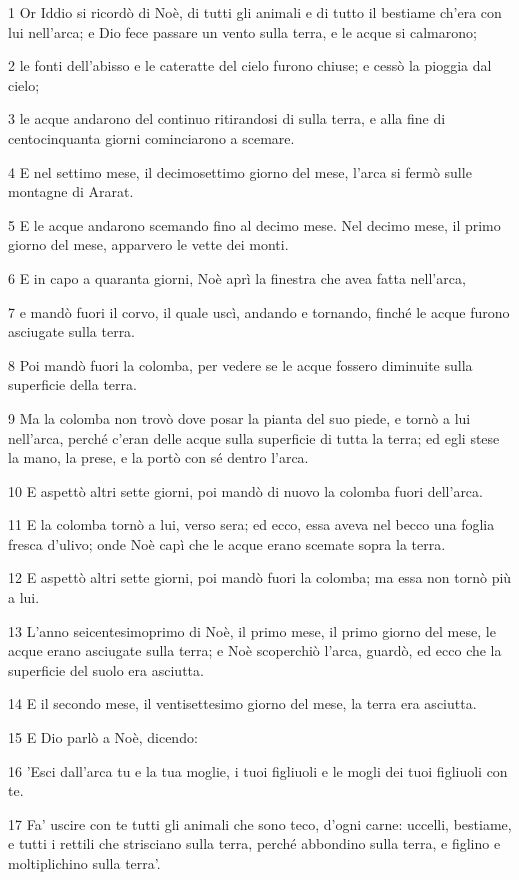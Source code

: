 \par 1 Or Iddio si ricordò di Noè, di tutti gli animali e di tutto il bestiame ch'era con lui nell'arca; e Dio fece passare un vento sulla terra, e le acque si calmarono;
\par 2 le fonti dell'abisso e le cateratte del cielo furono chiuse; e cessò la pioggia dal cielo;
\par 3 le acque andarono del continuo ritirandosi di sulla terra, e alla fine di centocinquanta giorni cominciarono a scemare.
\par 4 E nel settimo mese, il decimosettimo giorno del mese, l'arca si fermò sulle montagne di Ararat.
\par 5 E le acque andarono scemando fino al decimo mese. Nel decimo mese, il primo giorno del mese, apparvero le vette dei monti.
\par 6 E in capo a quaranta giorni, Noè aprì la finestra che avea fatta nell'arca,
\par 7 e mandò fuori il corvo, il quale uscì, andando e tornando, finché le acque furono asciugate sulla terra.
\par 8 Poi mandò fuori la colomba, per vedere se le acque fossero diminuite sulla superficie della terra.
\par 9 Ma la colomba non trovò dove posar la pianta del suo piede, e tornò a lui nell'arca, perché c'eran delle acque sulla superficie di tutta la terra; ed egli stese la mano, la prese, e la portò con sé dentro l'arca.
\par 10 E aspettò altri sette giorni, poi mandò di nuovo la colomba fuori dell'arca.
\par 11 E la colomba tornò a lui, verso sera; ed ecco, essa aveva nel becco una foglia fresca d'ulivo; onde Noè capì che le acque erano scemate sopra la terra.
\par 12 E aspettò altri sette giorni, poi mandò fuori la colomba; ma essa non tornò più a lui.
\par 13 L'anno seicentesimoprimo di Noè, il primo mese, il primo giorno del mese, le acque erano asciugate sulla terra; e Noè scoperchiò l'arca, guardò, ed ecco che la superficie del suolo era asciutta.
\par 14 E il secondo mese, il ventisettesimo giorno del mese, la terra era asciutta.
\par 15 E Dio parlò a Noè, dicendo:
\par 16 'Esci dall'arca tu e la tua moglie, i tuoi figliuoli e le mogli dei tuoi figliuoli con te.
\par 17 Fa' uscire con te tutti gli animali che sono teco, d'ogni carne: uccelli, bestiame, e tutti i rettili che strisciano sulla terra, perché abbondino sulla terra, e figlino e moltiplichino sulla terra'.
